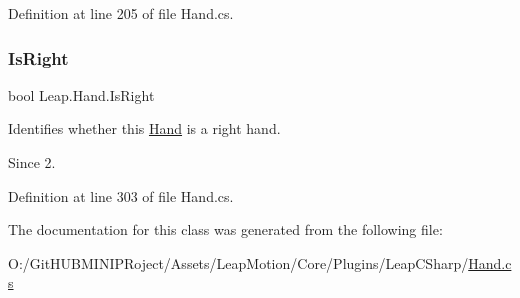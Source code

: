 Definition at line 205 of file Hand.\+cs.

\mbox{\label{class_leap_1_1_hand_afa3c502b072d3101b7366fd928376e18}} 
\subsubsection{\texorpdfstring{IsRight}{IsRight}}
{\footnotesize\ttfamily bool Leap.\+Hand.\+Is\+Right\hspace{0.3cm}{\ttfamily [get]}}



Identifies whether this \mbox{\hyperlink{class_leap_1_1_hand}{Hand}} is a right hand. 

\begin{DoxySince}{Since}
2. 
\end{DoxySince}


Definition at line 303 of file Hand.\+cs.



The documentation for this class was generated from the following file\+:\begin{DoxyCompactItemize}
\item 
O\+:/\+Git\+H\+U\+B\+M\+I\+N\+I\+P\+Roject/\+Assets/\+Leap\+Motion/\+Core/\+Plugins/\+Leap\+C\+Sharp/\mbox{\hyperlink{_leap_motion_2_core_2_plugins_2_leap_c_sharp_2_hand_8cs}{Hand.\+cs}}\end{DoxyCompactItemize}
